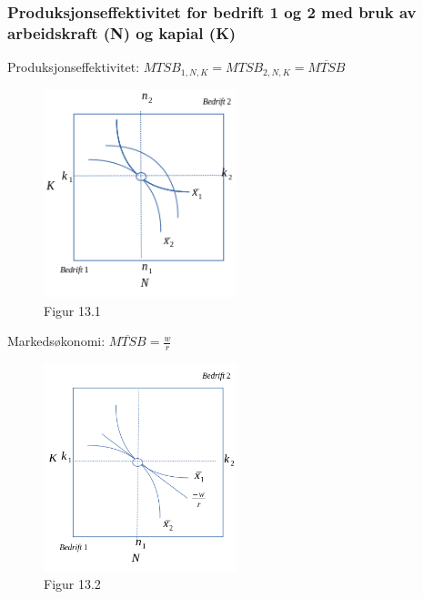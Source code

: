 \documentclass[
  letterpaper,
  DIV=11,
  numbers=noendperiod]{scrartcl}
\begin{document}
\subsubsection{Produksjonseffektivitet for bedrift 1 og 2 med bruk av
arbeidskraft (N) og kapial
(K)}\label{produksjonseffektivitet-for-bedrift-1-og-2-med-bruk-av-arbeidskraft-n-og-kapial-k}

Produksjonseffektivitet: \(MTSB_{1,N,K}=MTSB_{2,N,K}=\overline{MTSB}\)

\begin{figure}[H]

{\centering \includegraphics[width=0.5\textwidth,height=\textheight]{drawio/produ_eff.png}

}

\caption{Figur 13.1}

\end{figure}%

Markedsøkonomi: \(\overline{MTSB}=\frac{w}{r}\)

\begin{figure}[H]

{\centering \includegraphics[width=0.5\textwidth,height=\textheight]{drawio/produ_eff_m.png}

}

\caption{Figur 13.2}

\end{figure}%
\end{document}
